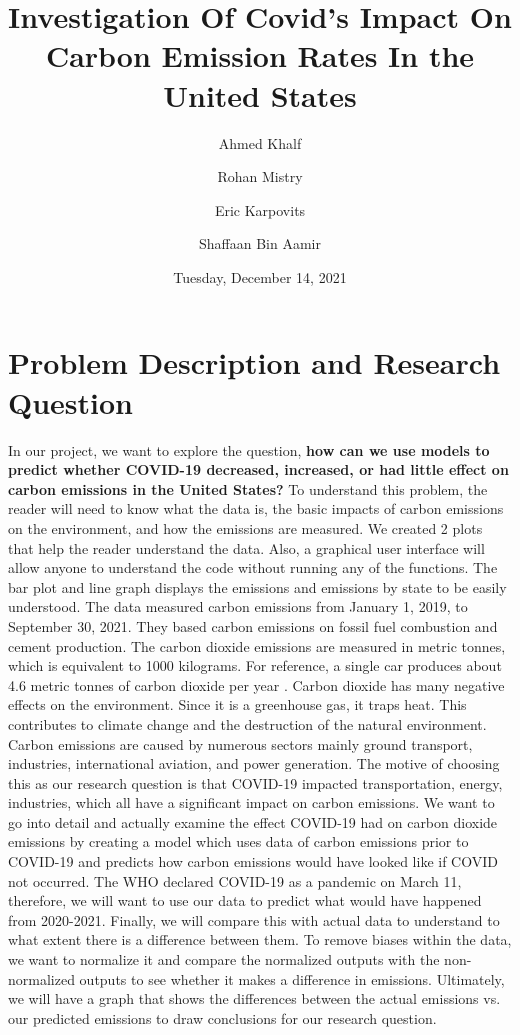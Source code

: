\documentclass[fontsize=11pt]{article}
\title{Investigation Of Covid’s Impact On Carbon Emission Rates In the United States}
\author{Ahmed Khalf \and Rohan Mistry \and Eric Karpovits \and Shaffaan Bin Aamir}
\date{Tuesday, December 14, 2021}
\begin{document}
\maketitle

\section{Problem Description and Research Question}

In our project, we want to explore the question, \textbf{how can we use models to predict whether COVID-19 decreased, increased, or had little effect on carbon emissions in the United States?} To understand this problem, the reader will need to know what the data is, the basic impacts of carbon emissions on the environment, and how the emissions are measured. We created 2 plots that help the reader understand the data. Also, a graphical user interface will allow anyone to understand the code without running any of the functions. The bar plot and line graph displays the emissions and emissions by state to be easily understood. The data measured carbon emissions from January 1, 2019, to September 30, 2021. They based carbon emissions on fossil fuel combustion and cement production. The carbon dioxide emissions are measured in metric tonnes, which is equivalent to 1000 kilograms. For reference, a single car produces about 4.6 metric tonnes of carbon dioxide per year \cite{epa}. Carbon dioxide has many negative effects on the environment. Since it is a greenhouse gas, it traps heat. This contributes to climate change and the destruction of the natural environment. Carbon emissions are caused by numerous sectors mainly ground transport, industries, international aviation, and power generation. The motive of choosing this as our research question is that COVID-19 impacted transportation, energy, industries, which all have a significant impact on carbon emissions. We want to go into detail and actually examine the effect COVID-19 had on carbon dioxide emissions by creating a model which uses data of carbon emissions prior to COVID-19 and predicts how carbon emissions would have looked like if COVID not occurred. The WHO declared COVID-19 as a pandemic on March 11, therefore, we will want to use our data to predict what would have happened from 2020-2021. Finally, we will compare this with actual data to understand to what extent there is a difference between them. To remove biases within the data, we want to normalize it and compare the normalized outputs with the non-normalized outputs to see whether it makes a difference in emissions. Ultimately, we will have a graph that shows the differences between the actual emissions vs. our predicted emissions to draw conclusions for our research question.
\end{document}
